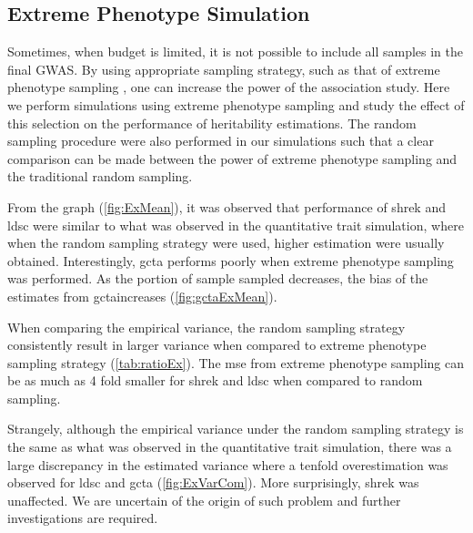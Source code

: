 		\subsection{Extreme Phenotype Simulation}
		
		Sometimes, when budget is limited, it is not possible to include all samples in the final \gls{GWAS}. 
		By using appropriate sampling strategy, such as that of extreme phenotype sampling \citep{Peloso2015}, one can increase the power of the association study.
		Here we perform simulations using extreme phenotype sampling and study the effect of this selection on the performance of heritability estimations.
		The random sampling procedure were also performed in our simulations such that a clear comparison can be made between the power of extreme phenotype sampling and the traditional random sampling.
		
		From the graph (\cref{fig:ExMean}), it was observed that performance of \gls{shrek} and \gls{ldsc} were similar to what was observed in the quantitative trait simulation, where when the random sampling strategy were used, higher estimation were usually obtained. 
		Interestingly, \gls{gcta} performs poorly when extreme phenotype sampling was performed.
		As the portion of sample sampled decreases, the bias of the estimates from \gls{gcta}increases (\cref{fig:gctaExMean}).
		
		When comparing the empirical variance, the random sampling strategy consistently result in  larger variance when compared to extreme phenotype sampling strategy (\cref{tab:ratioEx}).
		The \gls{mse} from extreme phenotype sampling can be as much as 4 fold smaller for \gls{shrek} and \gls{ldsc} when compared to random sampling.
		
		Strangely, although the empirical variance under the random sampling strategy is the same as what was observed in the quantitative trait simulation, there was a large discrepancy in the estimated variance where a tenfold overestimation was observed for \gls{ldsc} and \gls{gcta} (\cref{fig:ExVarCom}). 
		More surprisingly, \gls{shrek} was unaffected. 
		We are uncertain of the origin of such problem and further investigations are required.
		
